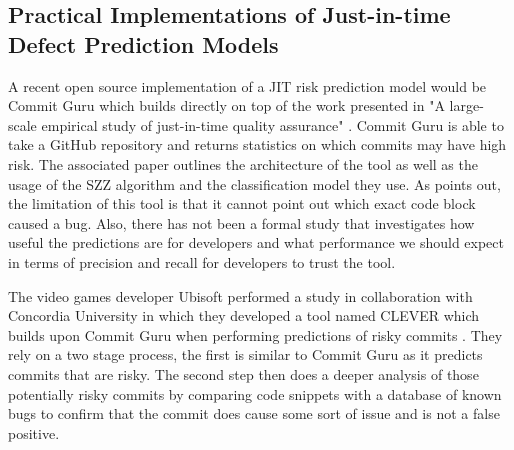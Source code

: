 \documentclass[../main.tex]{subfiles}
\begin{document}
\subsection{Practical Implementations of Just-in-time Defect Prediction Models}

A recent open source implementation of a JIT risk prediction model would be Commit Guru which builds directly on top of the work presented in "A large-scale empirical study of just-in-time quality assurance" \cite{rosen2015commit}. Commit Guru is able to take a GitHub repository and returns statistics on which commits may have high risk. The associated paper outlines the architecture of the tool as well as the usage of the SZZ algorithm and the classification model they use. As \cite{nayrolles2018clever} points out, the limitation of this tool is that it cannot point out which exact code block caused a bug. Also, there has not been a formal study that investigates how useful the predictions are for developers and what performance we should expect in terms of precision and recall for developers to trust the tool. 

The video games developer Ubisoft performed a study in collaboration with Concordia University in which they developed a tool named CLEVER which builds upon Commit Guru when performing predictions of risky commits \cite{nayrolles2018clever}. They rely on a two stage process, the first is similar to Commit Guru as it predicts commits that are risky. The second step then does a deeper analysis of those potentially risky commits by comparing code snippets with a database of known bugs to confirm that the commit does cause some sort of issue and is not a false positive. 
\end{document}
